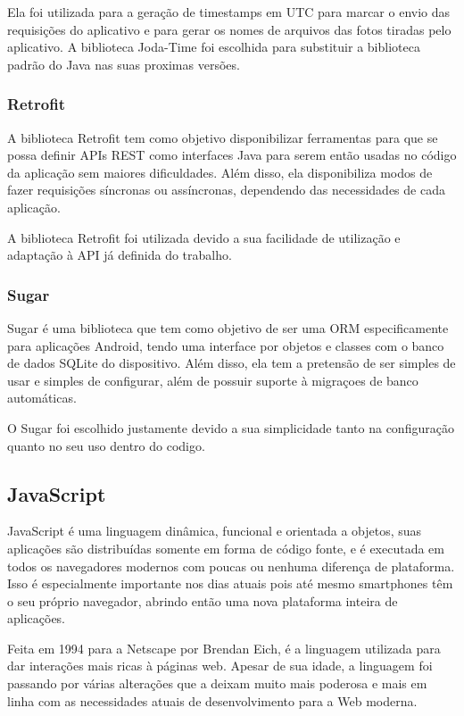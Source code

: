 \documentclass[
	article,			%
	11pt,				%
	oneside,			%
	a4paper,			%
	english,			%
	brazil,				%
	sumario=tradicional
	]{abntex2}
\begin{document}
Ela foi utilizada para a geração de timestamps em UTC para marcar o envio das requisições do aplicativo e para gerar os nomes de arquivos das fotos tiradas pelo aplicativo.
A biblioteca Joda-Time foi escolhida para substituir a biblioteca padrão do Java nas suas proximas versões.\cite{jodatime}

\subsubsection{Retrofit}

A biblioteca Retrofit tem como objetivo disponibilizar ferramentas para que se possa definir APIs REST como interfaces Java para serem então usadas no código da aplicação sem maiores dificuldades.
Além disso, ela disponibiliza modos de fazer requisições síncronas ou assíncronas, dependendo das necessidades de cada aplicação.\cite{retrofit}

A biblioteca Retrofit foi utilizada devido a sua facilidade de utilização e adaptação à API já definida do trabalho.

\subsubsection{Sugar}

Sugar é uma biblioteca que tem como objetivo de ser uma ORM especificamente para aplicações Android, tendo uma interface por objetos e classes com o banco de dados SQLite do dispositivo.
Além disso, ela tem a pretensão de ser simples de usar e simples de configurar, além de possuir suporte à migraçoes de banco automáticas.\cite{sugar}

O Sugar foi escolhido justamente devido a sua simplicidade tanto na configuração quanto no seu uso dentro do codigo.

\subsection{JavaScript}

JavaScript é uma linguagem dinâmica, funcional e orientada a objetos, suas aplicações são distribuídas somente em forma de código fonte, e é executada em todos os navegadores modernos com poucas ou nenhuma diferença de plataforma.
Isso é especialmente importante nos dias atuais pois até mesmo smartphones têm o seu próprio navegador, abrindo então uma nova plataforma inteira de aplicações.

Feita em 1994 para a Netscape por Brendan Eich, é a linguagem utilizada para dar interações mais ricas à páginas web.
Apesar de sua idade, a linguagem foi passando por várias alterações que a deixam muito mais poderosa e mais em linha com as necessidades atuais de desenvolvimento para a Web moderna.
\end{document}
